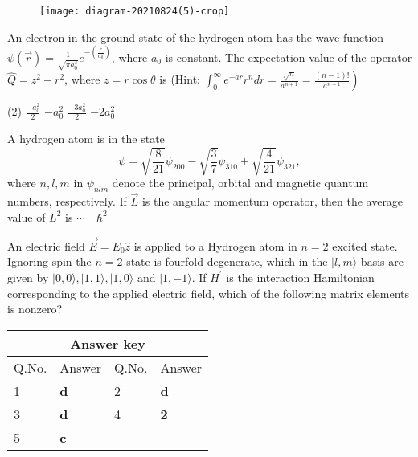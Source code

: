 \begin{enumerate}
\begin{tasks}
\begin{figure}[H]
	\end{figure}
	\task[\textbf{D.}]\begin{figure}[H]
		\centering
		\texttt{[image: diagram-20210824(5)-crop]}
	\end{figure}
\end{tasks}
\begin{minipage}{\textwidth}
	\item An electron in the ground state of the hydrogen atom has the wave function $\psi(\vec{r})=\frac{1}{\sqrt{\pi a_{0}^{3}}} e^{-\left(\frac{r}{a_{0}}\right)}$, where $a_{0}$ is constant. The expectation value of the operator $\hat{Q}=z^{2}-r^{2}$, where $z=r \cos \theta$ is
	(Hint: $\left.\int_{0}^{\infty} e^{-a r} r^{n} d r=\frac{\sqrt{n}}{a^{n+1}}=\frac{(n-1) !}{a^{n+1}}\right)$
\end{minipage}
\begin{tasks}(2)
	\task[\textbf{A.}] $\frac{-a_{0}^{2}}{2}$
	\task[\textbf{B.}]$-a_{0}^{2}$
	\task[\textbf{C.}]$\frac{-3 a_{0}^{2}}{2}$
	\task[\textbf{D.}]$-2 a_{0}^{2}$
\end{tasks}
\begin{minipage}{\textwidth}
	\item A hydrogen atom is in the state
	$$
	\psi=\sqrt{\frac{8}{21}} \psi_{200}-\sqrt{\frac{3}{7}} \psi_{310}+\sqrt{\frac{4}{21}} \psi_{321},
	$$
	where $n, l, m$ in $\psi_{n l m}$ denote the principal, orbital and magnetic quantum numbers, respectively. If $\vec{L}$ is the angular momentum operator, then the average value of $L^{2}$ is $\cdots \quad \hbar^{2}$
\end{minipage}
\begin{minipage}{\textwidth}
	\item An electric field $\vec{E}=E_{0} \hat{z}$ is applied to a Hydrogen atom in $n=2$ excited state. Ignoring spin the $n=2$ state is fourfold degenerate, which in the $|l, m\rangle$ basis are given by $|0,0\rangle,|1,1\rangle,|1,0\rangle$ and $|1,-1\rangle$. If $H^{\prime}$ is the interaction Hamiltonian corresponding to the applied electric field, which of the following matrix elements is nonzero?
\end{minipage}
\end{enumerate}


\setlength\arrayrulewidth{1pt}
\begin{table}[H]
	\centering
	
	\begin{tabular}{|p{1.5cm}|p{1.5cm}||p{1.5cm}|p{1.5cm}|}
		\hline
		\multicolumn{4}{|c|}{\textbf{Answer key}}\\\hline\hline
		\rowcolor{ocrel}Q.No.&Answer&Q.No.&Answer\\\hline
		1&\textbf{d}&2&\textbf{d}\\\hline
		3&\textbf{d}&4&\textbf{2}\\\hline
		5&\textbf{c}&&\\\hline
	\end{tabular}
\end{table}


